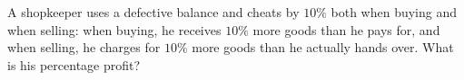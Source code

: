 A shopkeeper uses a defective balance and cheats by $10\%$ both when buying and when selling: when buying, he receives $10\%$ more goods than he pays for, and when selling, he charges for $10\%$ more goods than he actually hands over. What is his percentage profit?
